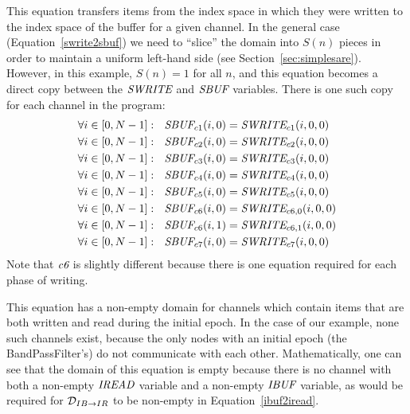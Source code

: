 This equation transfers items from the index space in which they were
written to the index space of the buffer for a given channel.  In the
general case (Equation~\ref{swrite2sbuf}) we need to ``slice'' the
domain into $S(n)$ pieces in order to maintain a uniform left-hand
side (see Section~\ref{sec:simplesare}).  However, in this example,
$S(n) = 1$ for all $n$, and this equation becomes a direct copy
between the $\mbox{\it SWRITE}$ and $\mbox{\it SBUF}$ variables.  There is one
such copy for each channel in the program:
\begin{align*}
\forall i \in [0, N-1]:~~\mbox{\it SBUF}_{c1}(i, 0) &= \mbox{\it SWRITE}_{c1}(i, 0, 0) \\
\forall i \in [0, N-1]:~~\mbox{\it SBUF}_{c2}(i, 0) &= \mbox{\it SWRITE}_{c2}(i, 0, 0) \\
\forall i \in [0, N-1]:~~\mbox{\it SBUF}_{c3}(i, 0) &= \mbox{\it SWRITE}_{c3}(i, 0, 0) \\
\forall i \in [0, N-1]:~~\mbox{\it SBUF}_{c4}(i, 0) &= \mbox{\it SWRITE}_{c4}(i, 0, 0) \\
\forall i \in [0, N-1]:~~\mbox{\it SBUF}_{c5}(i, 0) &= \mbox{\it SWRITE}_{c5}(i, 0, 0) \\
\forall i \in [0, N-1]:~~\mbox{\it SBUF}_{c6}(i, 0) &= \mbox{\it SWRITE}_{{c6}, 0}(i, 0, 0) \\
\forall i \in [0, N-1]:~~\mbox{\it SBUF}_{c6}(i, 1) &= \mbox{\it SWRITE}_{{c6}, 1}(i, 0, 0) \\
\forall i \in [0, N-1]:~~\mbox{\it SBUF}_{c7}(i, 0) &= \mbox{\it SWRITE}_{c7}(i, 0, 0)
\end{align*}
Note that $\mbox{\it c6}$ is slightly different because there is one
equation required for each phase of writing.


This equation has a non-empty domain for channels which contain items
that are both written and read during the initial epoch.  In the case
of our example, none such channels exist, because the only nodes with
an initial epoch (the BandPassFilter's) do not communicate with each
other.  Mathematically, one can see that the domain of this equation
is empty because there is no channel with both a non-empty
$\mbox{\it IREAD}$ variable and a non-empty $\mbox{\it IBUF}$ variable, as would
be required for ${\cal D}_{IB \rightarrow IR}$ to be non-empty in
Equation~\ref{ibuf2iread}.


